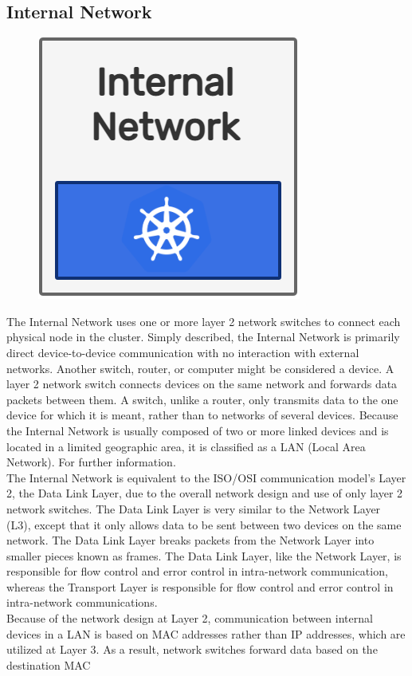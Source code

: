 \subsection{Internal Network}
\label{subsec:architecture_network_internal_network}

\begin{figure}
  \centering
  \includegraphics[width=.2\textwidth]{images/architecture/internal_network.png}
\end{figure}

The Internal Network uses one or more layer 2 network switches to connect each physical
node in the cluster. Simply described, the Internal Network is primarily direct device-to-device
communication with no interaction with external networks. Another switch, router,
or computer might be considered a device. A layer 2 network switch connects devices
on the same network and forwards data packets between them. A switch, unlike a router,
only transmits data to the one device for which it is meant, rather than to networks
of several devices\cite{switch}. Because the Internal Network is usually composed
of two or more linked devices and is located in a limited geographic area, it is
classified as a LAN (Local Area Network). For further information\cite{lan}. \\ %
The Internal Network is equivalent to the ISO/OSI communication model's Layer 2,
the Data Link Layer, due to the overall network design and use of only layer 2
network switches. The Data Link Layer is very similar to the Network Layer (L3),
except that it only allows data to be sent between two devices on the same
network. The Data Link Layer breaks packets from the Network Layer into smaller pieces
known as frames. The Data Link Layer, like the Network Layer, is responsible for
flow control and error control in intra-network communication, whereas the Transport
Layer is responsible for flow control and error control in intra-network communications\cite{osi}.
\\ %
Because of the network design at Layer 2, communication between internal devices
in a LAN is based on MAC addresses rather than IP addresses, which are utilized
at Layer 3. As a result, network switches forward data based on the destination MAC
